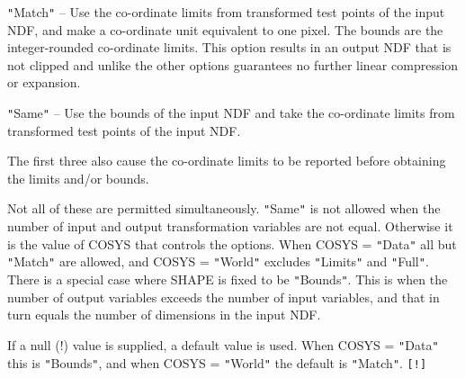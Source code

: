 \documentclass[twoside,11pt,nolof]{starlink}
\begin{document}
{{{{            \sstitem
            \texttt{"}Match\texttt{"}  -- Use the co-ordinate limits from transformed test
                           points of the input NDF, and make a co-ordinate
                           unit equivalent to one pixel.  The bounds are the
                           integer-rounded co-ordinate limits.  This option
                           results in an output NDF that is not clipped and
                           unlike the other options guarantees no further
                           linear compression or expansion.

            \sstitem
            \texttt{"}Same\texttt{"}   -- Use the bounds of the input NDF and take the
                           co-ordinate limits from transformed test points
                           of the input NDF.

         }
         The first three also cause the co-ordinate limits to be
         reported before obtaining the limits and/or bounds.

         Not all of these are permitted simultaneously.  \texttt{"}Same\texttt{"} is not
         allowed when the number of input and output transformation
         variables are not equal.  Otherwise it is the value of
         COSYS that controls the options.  When COSYS = \texttt{"}Data\texttt{"} all but
         \texttt{"}Match\texttt{"} are allowed, and COSYS = \texttt{"}World\texttt{"} excludes \texttt{"}Limits\texttt{"} and
         \texttt{"}Full\texttt{"}.  There is a special case where SHAPE is fixed to be
         \texttt{"}Bounds\texttt{"}.  This is when the number of output variables exceeds
         the number of input variables, and that in turn equals the
         number of dimensions in the input NDF.

         If a null (!) value is supplied, a default value is used. When
         COSYS = \texttt{"}Data\texttt{"} this is \texttt{"}Bounds\texttt{"}, and when COSYS = \texttt{"}World\texttt{"} the
         default is \texttt{"}Match\texttt{"}.  \texttt{[!]}
      }
      }}
\end{document}
